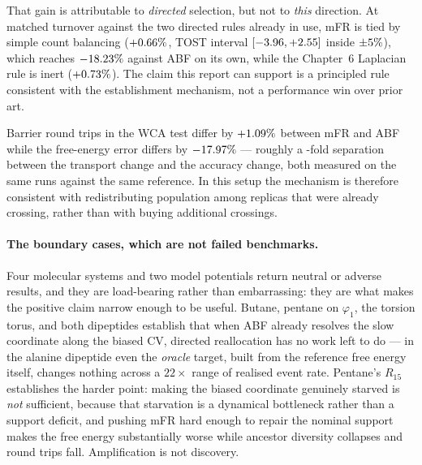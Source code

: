 That gain is attributable to \emph{directed} selection, but not to \emph{this} direction. At
matched turnover against the two directed rules already in use, mFR is tied by simple count
balancing ($+0.66\%$, TOST interval $[-3.96, +2.55]$ inside
$\pm5\%$), which reaches $-18.23\%$ against ABF on its own, while the
Chapter~6 Laplacian rule is inert ($+0.73\%$). The claim this report can support is a
principled rule consistent with the establishment mechanism, not a performance win over prior
art.

Barrier round trips in the WCA test differ by $+1.09\%$ between mFR and ABF
while the free-energy error differs by $-17.97\%$ --- roughly a
\WcvRoundTripSeparation-fold separation between the transport change and the accuracy change,
both measured on the same runs against the same reference. In this setup the mechanism
is therefore consistent with redistributing population among replicas that were already
crossing, rather than with buying additional crossings.

\paragraph{The boundary cases, which are not failed benchmarks.}
Four molecular systems and two model potentials return neutral or adverse results, and they
are load-bearing rather than embarrassing: they are what makes the positive claim narrow
enough to be useful. Butane, pentane on $\varphi_1$, the torsion torus, and both dipeptides
establish that when ABF already resolves the slow coordinate along the biased CV, directed
reallocation has no work left to do --- in the alanine dipeptide even the \emph{oracle}
target, built from the reference free energy itself, changes nothing across a $22\times$
range of realised event rate. Pentane's $R_{15}$ establishes the harder point: making the
biased coordinate genuinely starved is \emph{not} sufficient, because that starvation is a
dynamical bottleneck rather than a support deficit, and pushing mFR hard enough to repair the
nominal support makes the free energy substantially worse while ancestor diversity collapses
and round trips fall. Amplification is not discovery.

